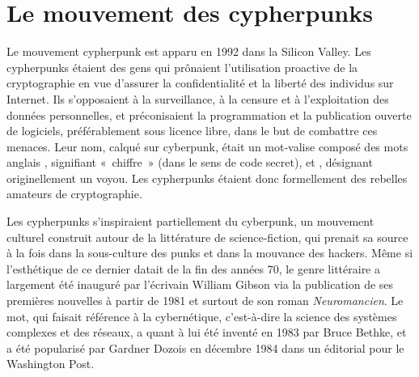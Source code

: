 \section*{Le mouvement des cypherpunks}

Le mouvement cypherpunk est apparu en 1992 dans la Silicon Valley. Les cypherpunks étaient des gens qui prônaient l'utilisation proactive de la cryptographie en vue d'assurer la confidentialité et la liberté des individus sur Internet. Ils s'opposaient à la surveillance, à la censure et à l'exploitation des données personnelles, et préconisaient la programmation et la publication ouverte de logiciels, préférablement sous licence libre, dans le but de combattre ces menaces. Leur nom, calqué sur cyberpunk, était un mot-valise composé des mots anglais , signifiant «~chiffre~» (dans le sens de code secret), et , désignant originellement un voyou. Les cypherpunks étaient donc formellement des rebelles amateurs de cryptographie.

Les cypherpunks s'inspiraient partiellement du cyberpunk, un mouvement culturel construit autour de la littérature de science-fiction, qui prenait sa source à la fois dans la sous-culture des punks et dans la mouvance des hackers. Même si l'esthétique de ce dernier datait de la fin des années 70, le genre littéraire a largement été inauguré par l'écrivain William Gibson via la publication de ses premières nouvelles à partir de 1981 et surtout de son roman \emph{Neuromancien}. Le mot, qui faisait référence à la cybernétique, c'est-à-dire la science des systèmes complexes et des réseaux, a quant à lui été inventé en 1983 par Bruce Bethke, et a été popularisé par Gardner Dozois en décembre 1984 dans un éditorial pour le Washington Post. %

